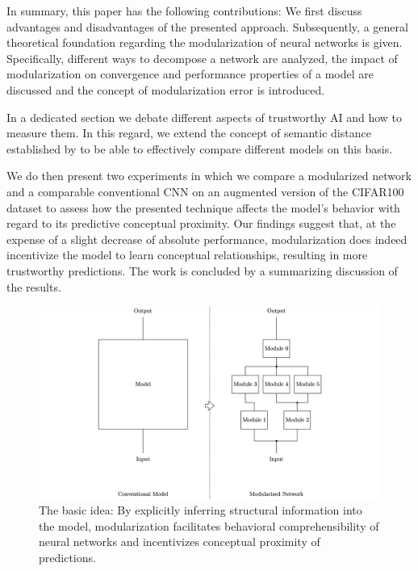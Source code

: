 \documentclass[conference]{IEEEtran}
\begin{document}
In summary, this paper has the following contributions: We first discuss advantages and disadvantages of the presented approach. Subsequently, a general theoretical foundation regarding the modularization of neural networks is given. Specifically, different ways to decompose a network are analyzed, the impact of modularization on convergence and performance properties of a model are discussed and the concept of modularization error is introduced.

In a dedicated section we debate different aspects of trustworthy AI and how to measure them. In this regard, we extend the concept of semantic distance established by \cite{Fergus2010-or} to be able to effectively compare different models on this basis.

We do then present two experiments in which we compare a modularized network and a comparable conventional CNN on an augmented version of the CIFAR100 dataset to assess how the presented technique affects the model's behavior with regard to its predictive conceptual proximity. Our findings suggest that, at the expense of a slight decrease of absolute performance, modularization does indeed incentivize the model to learn conceptual relationships, resulting in more trustworthy predictions. The work is concluded by a summarizing discussion of the results.

\begin{figure}
    \centering
    \includegraphics[width=\linewidth, trim=325 0 325 0, clip]{graphics/basic_concept.jpeg}
    \caption{The basic idea: By explicitly inferring structural information into the model, modularization facilitates behavioral comprehensibility of neural networks and incentivizes conceptual proximity of predictions.}
    \label{fig:introduction_basic_concept}
\end{figure}
\end{document}
